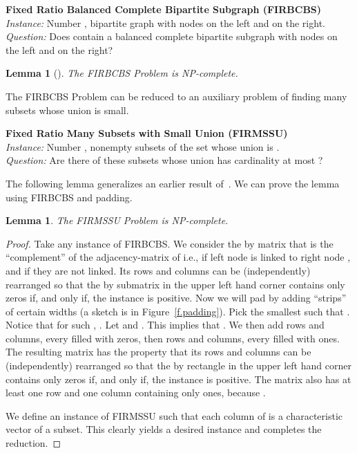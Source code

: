 \documentclass[letterpaper,11pt]{article}
\newtheorem{lemma}[theorem]{Lemma}
\newcommand{\FF}{\vspace*{\medskipamount}}
\begin{document}
\FF
\noindent
{\bf Fixed Ratio Balanced Complete Bipartite Subgraph (FIRBCBS)}\\
{\it Instance:} Number , bipartite graph  with  nodes on the left and  on the right.\\
{\it Question:} Does  contain a balanced complete bipartite subgraph with  nodes on the left and  on the right?
\FF

\begin{lemma}[\cite{Joh87}]
The FIRBCBS Problem is NP-complete.
\end{lemma}

The FIRBCBS Problem can be reduced to an auxiliary problem of finding many subsets whose union is small. 

\FF
\noindent
{\bf Fixed Ratio Many Subsets with Small Union (FIRMSSU)}\\
{\it Instance:} Number , nonempty subsets  of the set  whose union is .\\
{\it Question:} Are there  of these subsets whose union has cardinality at most ?
\FF

The following lemma generalizes an earlier result of~\cite{GaoM04}.
We can prove the lemma using FIRBCBS and padding.

\begin{lemma}
The FIRMSSU Problem is NP-complete.
\end{lemma}

\begin{proof}
Take any instance of FIRBCBS. We consider the  by  matrix  that is the ``complement'' of the adjacency-matrix of  i.e.,  if left node  is linked to right node , and  if they are not linked. Its rows and columns can be (independently) rearranged so that the  by  submatrix in the upper left hand corner contains only zeros if, and only if, the instance is positive. 
Now we will pad  by adding ``strips'' of certain widths (a sketch is in Figure~\ref{f.padding}). Pick the smallest  such that . Notice that for such , . Let  and . This implies that . We then add  rows and  columns, every filled with zeros, then  rows and  columns, every filled with ones. 
The resulting matrix  has the property that its rows and columns can be (independently) rearranged so that the  by  rectangle in the upper left hand corner contains only zeros if, and only if, the instance is positive. The matrix also has at least one row and one column containing only ones, because .


We define an instance of FIRMSSU such that each column of  is a characteristic vector of a subset. This clearly yields a desired instance and completes the reduction.
\end{proof}
\end{document}
